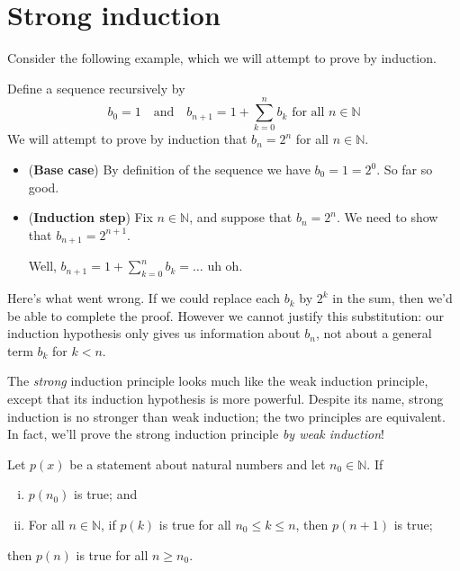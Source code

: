 \section{Strong induction}

Consider the following example, which we will attempt to prove by induction.

\begin{example}
\label{exProofByWeakInductionFail}
Define a sequence recursively by
\[ b_0 = 1 \quad \text{and} \quad b_{n+1} = 1 + \sum_{k=0}^n b_k \text{ for all } n \in \mathbb{N} \]
We will attempt to prove by induction that $b_n = 2^n$ for all $n \in \mathbb{N}$.

\begin{itemize}
\item (\textbf{Base case}) By definition of the sequence we have $b_0=1=2^0$. So far so good.

\item (\textbf{Induction step}) Fix $n \in \mathbb{N}$, and suppose that $b_n = 2^n$. We need to show that $b_{n+1}=2^{n+1}$.

Well, $b_{n+1} = 1 + \sum_{k=0}^n b_k = {\dots}$ uh oh.
\end{itemize}

Here's what went wrong. If we could replace each $b_k$ by $2^k$ in the sum, then we'd be able to complete the proof. However we cannot justify this substitution: our induction hypothesis only gives us information about $b_n$, not about a general term $b_k$ for $k < n$.
\end{example}

The \textit{strong} induction principle looks much like the weak induction principle, except that its induction hypothesis is more powerful. Despite its name, strong induction is no stronger than weak induction; the two principles are equivalent. In fact, we'll prove the strong induction principle \textit{by weak induction}!

\begin{theorem}
\label{thmStrongInduction}
Let $p(x)$ be a statement about natural numbers and let $n_0 \in \mathbb{N}$. If
\begin{enumerate}[(i)]
\item $p(n_0)$ is true; and
\item For all $n \in \mathbb{N}$, if $p(k)$ is true for all $n_0 \le k \le n$, then $p(n+1)$ is true;
\end{enumerate}
then $p(n)$ is true for all $n \ge n_0$.
\end{theorem}

